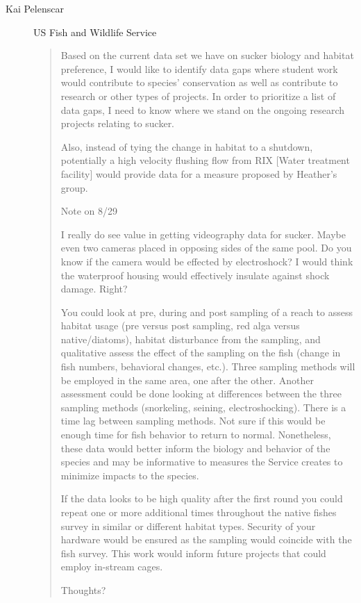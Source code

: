 \documentclass{tufte-handout}\usepackage[]{graphicx}\usepackage[]{color}
\begin{document}
\begin{description}
  \item[Kai Pelenscar]US Fish and Wildlife Service
  \begin{quote}
Based on the current data set we have on sucker biology and habitat preference, I would like to identify data gaps where student work would contribute to species' conservation as well as contribute to research or other types of projects. In order to prioritize a list of data gaps, I need to know where we stand on the ongoing research projects relating to sucker.

Also, instead of tying the change in habitat to a shutdown, potentially a high velocity flushing flow from RIX [Water treatment facility] would provide data for a measure proposed by Heather's group. 

\noindent Note on 8/29

I really do see value in getting videography data for sucker. Maybe even two cameras placed in opposing sides of the same pool. Do you know if the camera would be effected by electroshock? I would think the waterproof housing would effectively insulate against shock damage. Right? 

You could look at pre, during and post sampling of a reach to assess habitat usage (pre versus post sampling, red alga versus native/diatoms), habitat disturbance from the sampling, and qualitative assess the effect of the sampling on the fish (change in fish numbers, behavioral changes, etc.). Three sampling methods will be employed in the same area, one after the other. Another assessment could be done looking at differences between the three sampling methods (snorkeling, seining, electroshocking). There is a time lag between sampling methods. Not sure if this would be enough time for fish behavior to return to normal. Nonetheless, these data would better inform the biology and behavior of the species and may be informative to measures the Service creates to minimize impacts to the species. 

If the data looks to be high quality after the first round you could repeat one or more additional times throughout the native fishes survey in similar or different habitat types. Security of your hardware would be ensured as the sampling would coincide with the fish survey. This work would inform future projects that could employ in-stream cages. 

Thoughts?

\end{quote}


\end{description}
\end{document}
